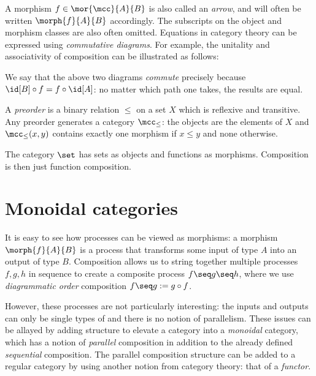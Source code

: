 A morphism \(f \in \mor{\mcc}{A}{B}\) is also called an \emph{arrow}, and will
often be written \(\morph{f}{A}{B}\) accordingly.
The subscripts on the object and morphism classes are also often omitted.
Equations in category theory can be expressed using \emph{commutative diagrams}.
For example, the unitality and associativity of composition can be illustrated
as follows:

\begin{center}
    
    \quad
    
\end{center}

We say that the above two diagrams \emph{commute} precisely because \(
    \id[B] \circ f = f \circ \id[A]
\): no matter which path one takes, the results are equal.

\begin{example}[Preorder]
    A \emph{preorder} is a binary relation \(\leq\) on a set \(X\) which is
    reflexive and transitive.
    Any preorder generates a category \(\mcc_\leq\): the objects are the
    elements of \(X\) and \(\mcc_\leq(x, y)\) contains exactly one morphism if
    \(x \leq y\) and none otherwise.
\end{example}

\begin{example}
    The category \(\set\) has sets as objects and functions as morphisms.
    Composition is then just function composition.
\end{example}

\section{Monoidal categories}

It is easy to see how processes can be viewed as morphisms: a morphism
\(\morph{f}{A}{B}\) is a process that transforms some input of type \(A\) into
an output of type \(B\).
Composition allows us to string together multiple processes \(f, g, h\) in
sequence to create a composite process \(f \seq g \seq h\), where we use
\emph{diagrammatic order} composition \(f \seq g := g \circ f\).

However, these processes are not particularly interesting: the inputs and
outputs can only be single types of and there is no notion of parallelism.
These issues can be allayed by adding structure to elevate a category into a
\emph{monoidal} category, which has a notion of \emph{parallel} composition in
addition to the already defined \emph{sequential} composition.
The parallel composition structure can be added to a regular category by using
another notion from category theory: that of a \emph{functor}.

